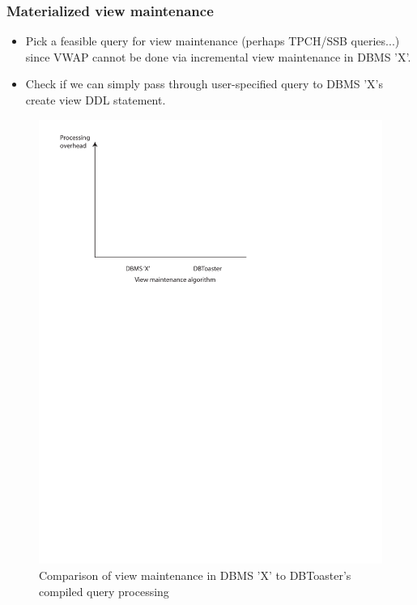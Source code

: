 \documentclass{sig-alternate}
\begin{document}
\subsubsection{Materialized view maintenance}
\begin{itemize}
\item Pick a feasible query for view maintenance (perhaps TPCH/SSB queries...) since
  VWAP cannot be done via incremental view maintenance in DBMS 'X'.
\item Check if we can simply pass through user-specified query to DBMS 'X's create
  view DDL statement.
\end{itemize}

\begin{figure}
\includegraphics[scale=0.6]{figures/axes-views.pdf}
\caption{Comparison of view maintenance in DBMS 'X' to DBToaster's compiled query processing}
\label{fig:overhead-trigger}
\end{figure}
\end{document}
